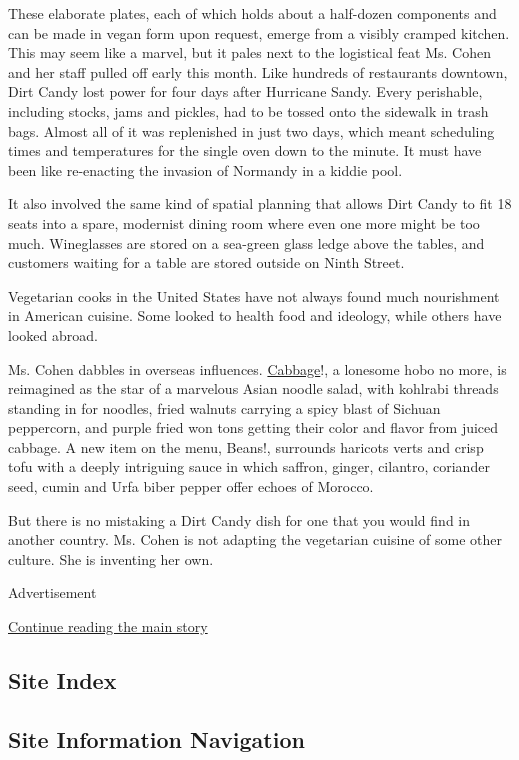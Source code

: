 These elaborate plates, each of which holds about a half-dozen
components and can be made in vegan form upon request, emerge from a
visibly cramped kitchen. This may seem like a marvel, but it pales next
to the logistical feat Ms. Cohen and her staff pulled off early this
month. Like hundreds of restaurants downtown, Dirt Candy lost power for
four days after Hurricane Sandy. Every perishable, including stocks,
jams and pickles, had to be tossed onto the sidewalk in trash bags.
Almost all of it was replenished in just two days, which meant
scheduling times and temperatures for the single oven down to the
minute. It must have been like re-enacting the invasion of Normandy in a
kiddie pool.

It also involved the same kind of spatial planning that allows Dirt
Candy to fit 18 seats into a spare, modernist dining room where even one
more might be too much. Wineglasses are stored on a sea-green glass
ledge above the tables, and customers waiting for a table are stored
outside on Ninth Street.

Vegetarian cooks in the United States have not always found much
nourishment in American cuisine. Some looked to health food and
ideology, while others have looked abroad.

Ms. Cohen dabbles in overseas influences.
\href{http://www.dirtcandynyc.com/?p=4607}{Cabbage}!, a lonesome hobo no
more, is reimagined as the star of a marvelous Asian noodle salad, with
kohlrabi threads standing in for noodles, fried walnuts carrying a spicy
blast of Sichuan peppercorn, and purple fried won tons getting their
color and flavor from juiced cabbage. A new item on the menu, Beans!,
surrounds haricots verts and crisp tofu with a deeply intriguing sauce
in which saffron, ginger, cilantro, coriander seed, cumin and Urfa biber
pepper offer echoes of Morocco.

But there is no mistaking a Dirt Candy dish for one that you would find
in another country. Ms. Cohen is not adapting the vegetarian cuisine of
some other culture. She is inventing her own.

Advertisement

\protect\hyperlink{after-bottom}{Continue reading the main story}

\hypertarget{site-index}{%
\subsection{Site Index}\label{site-index}}

\hypertarget{site-information-navigation}{%
\subsection{Site Information
Navigation}\label{site-information-navigation}}

